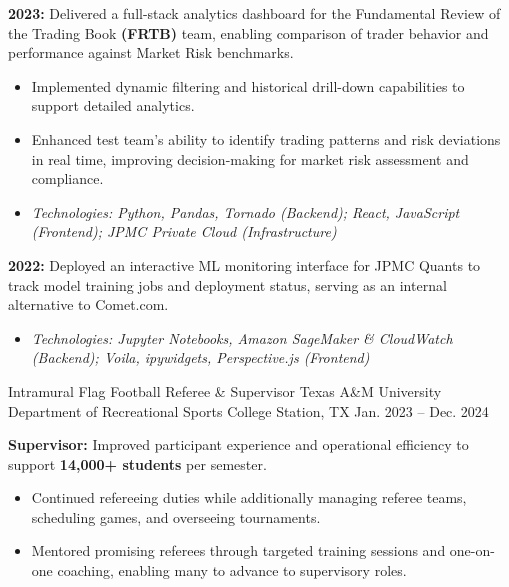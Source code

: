 \begin{cventries}
{\begin{cvitems}
{\begin{itemize}
      \end{itemize}
        }
        \item { \textbf{2023:} Delivered a full-stack analytics dashboard for the Fundamental Review of the Trading Book \textbf{(FRTB)} team, enabling comparison of trader behavior and performance against Market Risk benchmarks.
        \begin{itemize}
        \item Implemented dynamic filtering and historical drill-down capabilities to support detailed analytics.
        \item Enhanced test team’s ability to identify trading patterns and risk deviations in real time, improving decision-making for market risk assessment and compliance.
        \item \textit{Technologies: Python, Pandas, Tornado (Backend); React, JavaScript (Frontend); JPMC Private Cloud (Infrastructure)} 
        \end{itemize}
        }
        \item{
        \textbf{2022:} Deployed an interactive ML monitoring interface for JPMC Quants to track model training jobs and deployment status, serving as an internal alternative to Comet.com.
        \begin{itemize}
        \item \textit{Technologies: Jupyter Notebooks, Amazon SageMaker \& CloudWatch (Backend); Voila, ipywidgets, Perspective.js (Frontend)}
        \end{itemize}
        }
      \end{cvitems}
    }
\cventry
  {Intramural Flag Football Referee \& Supervisor} %
  {Texas A\&M University Department of Recreational Sports} %
  {College Station, TX} %
  {Jan. 2023 -- Dec. 2024} %
  { 
    \begin{cvitems}   
      \item{
      \textbf{Supervisor:} Improved participant experience and operational efficiency to support \textbf{14,000+ students} per semester.
      \begin{itemize}
      \item Continued refereeing duties while additionally managing referee teams, scheduling games, and overseeing tournaments.
      \item Mentored promising referees through targeted training sessions and one-on-one coaching, enabling many to advance to supervisory roles.

\end{itemize}}
\end{cvitems}}
\end{cventries}
